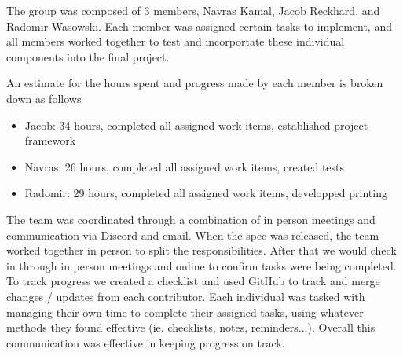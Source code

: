 The group was composed of 3 members, Navras Kamal, Jacob Reckhard, and
Radomir Wasowski.  Each member was assigned certain tasks to implement, and
all members worked together to test and incorportate these individual
components into the final project.

An estimate for the hours spent and progress made by each member is broken down as follows
\begin{itemize}
\item{Jacob: 34 hours, completed all assigned work items, established project framework}
\item{Navras: 26 hours, completed all assigned work items, created tests}
\item{Radomir: 29 hours, completed all assigned work items, developped printing}
\end{itemize}

The team was coordinated through a combination of in person meetings and
communication via Discord and email.  When the spec was released, the team
worked together in person to split the responsibilities.  After that we would
check in through in person meetings and online to confirm tasks were being
completed.  To track progress we created a checklist and used GitHub to track
and merge changes / updates from each contributor.  Each individual was tasked
with managing their own time to complete their assigned tasks, using whatever
methods they found effective (ie. checklists, notes, reminders...).  Overall
this communication was effective in keeping progress on track.
